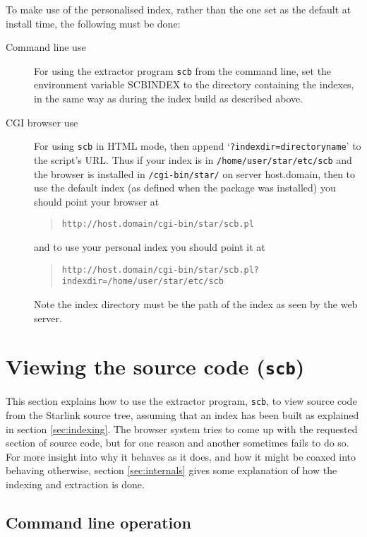 \documentclass[twoside,11pt]{article}
\newcommand{\xlabel}[1]{}
\renewcommand{\_}{\texttt{\symbol{95}}}
\begin{document}
To make use of the personalised index, rather than the one set as
the default at install time, the following must be done:
\begin{description}
\item[Command line use]
For using the extractor program {\tt scb} from the command line,
set the environment variable SCB\_INDEX to the directory containing
the indexes, in the same way as during the index build as described
above.
\item[CGI browser use]
For using {\tt scb} in HTML mode, then append
`{\tt ?indexdir=directoryname}' to the script's URL.
Thus if your index is in {\tt /home/user/star/etc/scb}
and the browser is installed in {\tt /cgi-bin/star/} on server
host.domain, then to use the default index (as defined when the
package was installed) you should point
your browser at
\begin{quote}
\begin{verbatim}
http://host.domain/cgi-bin/star/scb.pl
\end{verbatim}
\end{quote}
and to use your personal index you should point it at
\begin{quote}
\begin{verbatim}
http://host.domain/cgi-bin/star/scb.pl?indexdir=/home/user/star/etc/scb
\end{verbatim}
\end{quote}
Note the index directory must be the path of the index as seen by
the web server.
\end{description}


\section{\xlabel{sec:extract}\label{sec:extract}Viewing the source code
         ({\tt scb})}

This section explains how to use the extractor program, {\tt scb},
to view source code from the Starlink source tree,
assuming that an index has been built as explained in
section \ref{sec:indexing}.
The browser system tries to come up with the requested section of
source code, but for one reason and another sometimes fails to
do so.
For more insight into why it behaves as it does, and
how it might be coaxed into behaving otherwise,
section \ref{sec:internals} gives some explanation of how the
indexing and extraction is done.


\subsection{\xlabel{sec:extract-commandline}\label{sec:extract-commandline}Command line operation}
\end{document}
